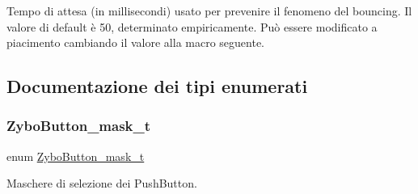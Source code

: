 Tempo di attesa (in millisecondi) usato per prevenire il fenomeno del bouncing. Il valore di default è 50, determinato empiricamente. Può essere modificato a piacimento cambiando il valore alla macro seguente. 



\subsection{Documentazione dei tipi enumerati}
\mbox{\label{group___button_ga4d26a5f6cad606de534ba034e0ba42dd}} 
\subsubsection{\texorpdfstring{Zybo\+Button\+\_\+mask\+\_\+t}{ZyboButton\_mask\_t}}
{\footnotesize\ttfamily enum \hyperlink{group___button_ga4d26a5f6cad606de534ba034e0ba42dd}{Zybo\+Button\+\_\+mask\+\_\+t}}



Maschere di selezione dei Push\+Button. 

